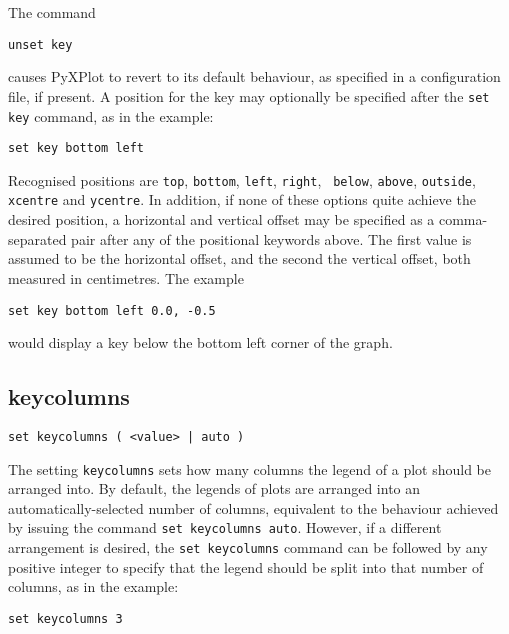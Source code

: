 \noindent The command

\begin{verbatim}
unset key
\end{verbatim}

\noindent causes PyXPlot to revert to its default behaviour, as specified in a
configuration file, if present. A position for the key may optionally be
specified after the {\tt set key} command, as in the example:

\begin{verbatim}
set key bottom left
\end{verbatim}

Recognised positions are {\tt top}, {\tt bottom}, {\tt left}, {\tt right}, {\tt
below}, {\tt above}, {\tt outside}, {\tt xcentre} and {\tt ycentre}. In
addition, if none of these options quite achieve the desired position, a
horizontal and vertical offset may be specified as a comma-separated pair after
any of the positional keywords above.  The first value is assumed to be the
horizontal offset, and the second the vertical offset, both measured in
centimetres.  The example

\begin{verbatim}
set key bottom left 0.0, -0.5
\end{verbatim}

\noindent would display a key below the bottom left corner of the graph.


\subsection{keycolumns}

\begin{verbatim}
set keycolumns ( <value> | auto )
\end{verbatim}

The setting {\tt keycolumns} sets how many columns the legend of a plot should
be arranged into. By default, the legends of plots are arranged into an
automatically-selected number of columns, equivalent to the behaviour achieved
by issuing the command {\tt set key\-columns auto}. However, if a different
arrangement is desired, the {\tt set keycolumns} command can be followed by any
positive integer to specify that the legend should be split into that number of
columns, as in the example:

\begin{verbatim}
set keycolumns 3
\end{verbatim}


